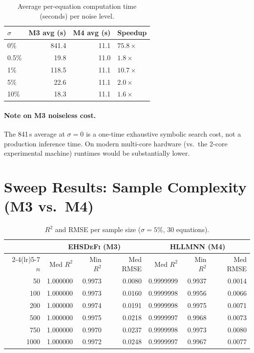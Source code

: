 \documentclass[twoside,11pt]{article}
\newcommand{\EHD}{\textsc{EHSDeFi}}
\newcommand{\HSL}{\textsc{HLLMNN}}
\newcommand{\Rsq}{R^{2}}
\begin{document}
\begin{table}[H]
\centering
\caption{Average per-equation computation time (seconds) per noise level.}
\label{tab:time_noise}
\small
\begin{tabular}{lrrl}
\toprule
$\sigma$ & \textcolor{m3blue}{M3 avg (s)} & \textcolor{m4red}{M4 avg (s)} & Speedup\\
\midrule
0\%   & 841.4 & 11.1 & $\mathbf{75.8\times}$\\
0.5\% &  19.8 & 11.0 & $1.8\times$\\
1\%   & 118.5 & 11.1 & $\mathbf{10.7\times}$\\
5\%   &  22.6 & 11.1 & $2.0\times$\\
10\%  &  18.3 & 11.1 & $1.6\times$\\
\bottomrule
\end{tabular}
\end{table}

\paragraph{Note on M3 noiseless cost.}
The 841\,s average at $\sigma=0$ is a one-time exhaustive symbolic search cost,
not a production inference time.  On modern multi-core hardware (vs.\ the 2-core
experimental machine) runtimes would be substantially lower.

\section{Sweep Results: Sample Complexity (M3 vs.\ M4)}
\label{sec:sc}

\begin{table}[H]
\centering
\caption{$\Rsq$ and RMSE per sample size ($\sigma=5\%$, 30 equations).}
\label{tab:sc_metrics}
\renewcommand{\arraystretch}{1.2}
\small
\begin{tabular}{r r r r r r r}
\toprule
& \multicolumn{3}{c}{\textcolor{m3blue}{\textbf{\EHD{} (M3)}}}
& \multicolumn{3}{c}{\textcolor{m4red}{\textbf{\HSL{} (M4)}}}\\
\cmidrule(lr){2-4}\cmidrule(lr){5-7}
$n$ & Med $\Rsq$ & Min $\Rsq$ & Med RMSE & Med $\Rsq$ & Min $\Rsq$ & Med RMSE\\
\midrule
  50 & 1.000000 & 0.9973 & 0.0080 & 0.9999999 & 0.9937 & 0.0014\\
 100 & 1.000000 & 0.9973 & 0.0160 & 0.9999998 & 0.9956 & 0.0066\\
 200 & 1.000000 & 0.9974 & 0.0191 & 0.9999998 & 0.9975 & 0.0071\\
 500 & 1.000000 & 0.9975 & 0.0218 & 0.9999997 & 0.9968 & 0.0073\\
 750 & 1.000000 & 0.9970 & 0.0237 & 0.9999998 & 0.9973 & 0.0080\\
1000 & 1.000000 & 0.9972 & 0.0248 & 0.9999997 & 0.9967 & 0.0077\\
\bottomrule
\end{tabular}
\end{table}
\end{document}
